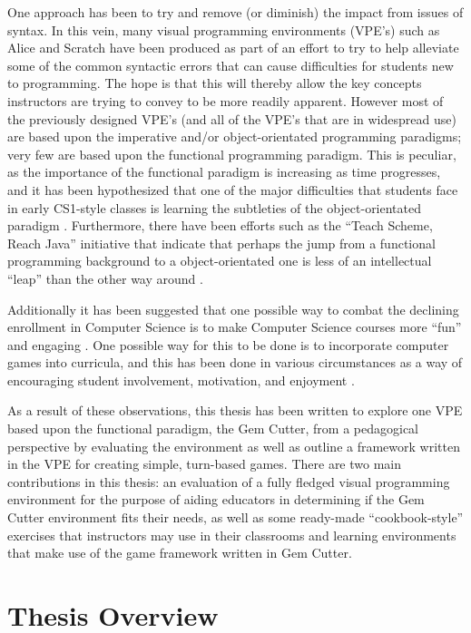 One approach has been to try and remove (or diminish) the impact from issues of syntax.  In this vein, many visual programming environments (VPE's) such as Alice\cite{alice} and Scratch\cite{scratch} have been produced as part of an effort to try to help alleviate some of the common syntactic errors that can cause difficulties for students new to programming.  The hope is that this will thereby allow the key concepts instructors are trying to convey to be more readily apparent.  However most of the previously designed VPE's (and all of the VPE's that are in widespread use) are based upon the imperative and/or object-orientated programming paradigms; very few are based upon the functional programming paradigm.  This is peculiar, as the importance of the functional paradigm is increasing as time progresses, and it has been hypothesized that one of the major difficulties that students face in early CS1-style classes is learning the subtleties of the object-orientated paradigm \cite{Manaris07,Mahmoud04,Benander04}. Furthermore, there have been efforts such as the ``Teach Scheme, Reach Java'' initiative \cite{Bloch08,teachScheme,Felleisen04} that indicate that perhaps the jump from a functional programming background to a object-orientated one is less of an intellectual ``leap'' than the other way around \cite{Huch05}.

Additionally it has been suggested that one possible way to combat the declining enrollment in Computer Science is to make Computer Science courses more ``fun'' and engaging \cite{Carter06}.  One possible way for this to be done is to incorporate computer games into  curricula, and this has been done in various circumstances as a way of encouraging student involvement, motivation, and enjoyment \cite{Barnes08,Gooch08,Curtis05,Overmars05,Sweedyk05}.

As a result of these observations, this thesis has been written to explore one VPE based upon the functional paradigm, the Gem Cutter, from a pedagogical perspective by evaluating the environment as well as outline a framework written in the VPE for creating simple, turn-based games.  There are two main contributions in this thesis: an evaluation of a fully fledged visual programming environment for the purpose of aiding educators in determining if the Gem Cutter environment fits their needs, as well as some ready-made ``cookbook-style'' exercises that instructors may use in their classrooms and learning environments that make use of the game framework written in Gem Cutter.

\section{Thesis Overview}

